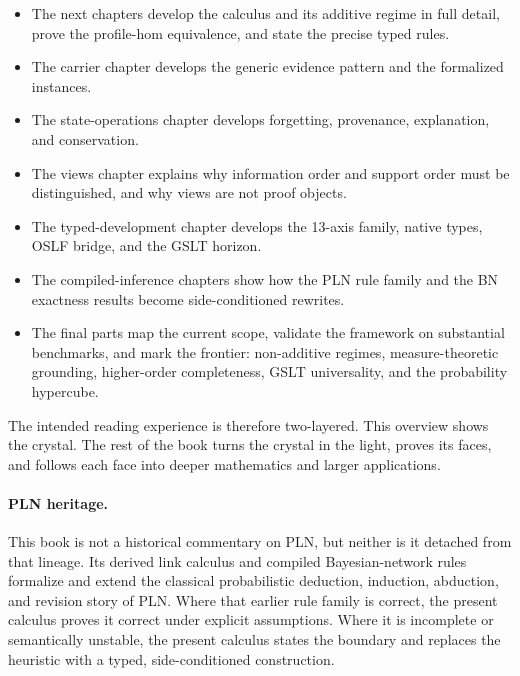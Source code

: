 \begin{itemize}
\item The next chapters develop the calculus and its additive regime in full
  detail, prove the profile-hom equivalence, and state the precise typed rules.
\item The carrier chapter develops the generic evidence pattern and the
  formalized instances.
\item The state-operations chapter develops forgetting, provenance,
  explanation, and conservation.
\item The views chapter explains why information order and support order
  must be distinguished, and why views are not proof objects.
\item The typed-development chapter develops the 13-axis family, native
  types, OSLF bridge, and the GSLT horizon.
\item The compiled-inference chapters show how the PLN rule family and the
  BN exactness results become side-conditioned rewrites.
\item The final parts map the current scope, validate the framework on
  substantial benchmarks, and mark the frontier: non-additive regimes,
  measure-theoretic grounding, higher-order completeness, GSLT universality,
  and the probability hypercube.
\end{itemize}

The intended reading experience is therefore two-layered.  This overview
shows the crystal.  The rest of the book turns the crystal in the light,
proves its faces, and follows each face into deeper mathematics and larger
applications.

\paragraph{PLN heritage.}
This book is not a historical commentary on PLN, but neither is it detached
from that lineage.  Its derived link calculus and compiled Bayesian-network
rules formalize and extend the classical probabilistic deduction,
induction, abduction, and revision story of PLN.  Where that earlier rule
family is correct, the present calculus proves it correct under explicit
assumptions.  Where it is incomplete or semantically unstable, the present
calculus states the boundary and replaces the heuristic with a typed,
side-conditioned construction.
